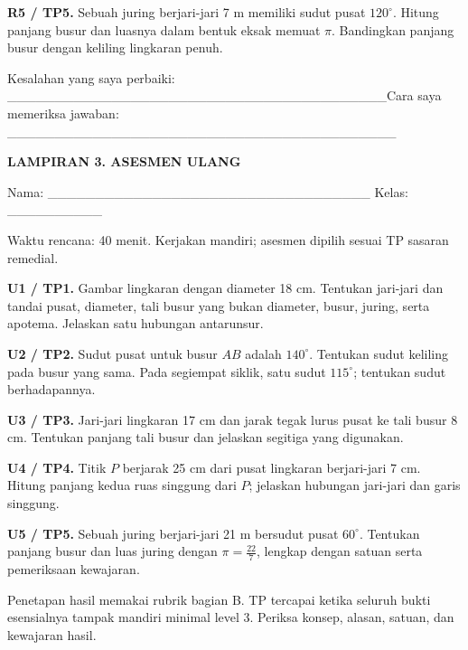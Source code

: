 \documentclass[11pt,a4paper]{article}
\begin{document}
\noindent\textbf{R5 / TP5.} Sebuah juring berjari-jari 7 m memiliki sudut pusat \(120^\circ\). Hitung panjang busur dan luasnya dalam bentuk eksak memuat \(\pi\). Bandingkan panjang busur dengan keliling lingkaran penuh.\par\vspace{10mm}
{\small Kesalahan yang saya perbaiki: \_\_\_\_\_\_\_\_\_\_\_\_\_\_\_\_\_\_\_\_\_\_\_\_\_\_\_\_\_\_\_\_\_\_\_\_\_\_\_\_\newline Cara saya memeriksa jawaban: \_\_\_\_\_\_\_\_\_\_\_\_\_\_\_\_\_\_\_\_\_\_\_\_\_\_\_\_\_\_\_\_\_\_\_\_\_\_\_\_\_\par}\medskip
\clearpage
\begin{center}\bfseries\large LAMPIRAN 3. ASESMEN ULANG\end{center}\medskip
{\small Nama: \_\_\_\_\_\_\_\_\_\_\_\_\_\_\_\_\_\_\_\_\_\_\_\_\_\_\_\_\_\_\_\_\_\_  Kelas: \_\_\_\_\_\_\_\_\_\_\par}\medskip
{\small Waktu rencana: 40 menit. Kerjakan mandiri; asesmen dipilih sesuai TP sasaran remedial.\par}\medskip
\noindent\textbf{U1 / TP1.} Gambar lingkaran dengan diameter 18 cm. Tentukan jari-jari dan tandai pusat, diameter, tali busur yang bukan diameter, busur, juring, serta apotema. Jelaskan satu hubungan antarunsur.\par\vspace{10mm}
\noindent\textbf{U2 / TP2.} Sudut pusat untuk busur \(AB\) adalah \(140^\circ\). Tentukan sudut keliling pada busur yang sama. Pada segiempat siklik, satu sudut \(115^\circ\); tentukan sudut berhadapannya.\par\vspace{10mm}
\noindent\textbf{U3 / TP3.} Jari-jari lingkaran 17 cm dan jarak tegak lurus pusat ke tali busur 8 cm. Tentukan panjang tali busur dan jelaskan segitiga yang digunakan.\par\vspace{10mm}
\noindent\textbf{U4 / TP4.} Titik \(P\) berjarak 25 cm dari pusat lingkaran berjari-jari 7 cm. Hitung panjang kedua ruas singgung dari \(P\); jelaskan hubungan jari-jari dan garis singgung.\par\vspace{10mm}
\noindent\textbf{U5 / TP5.} Sebuah juring berjari-jari 21 m bersudut pusat \(60^\circ\). Tentukan panjang busur dan luas juring dengan \(\pi=\frac{22}{7}\), lengkap dengan satuan serta pemeriksaan kewajaran.\par\vspace{10mm}
{\small Penetapan hasil memakai rubrik bagian B. TP tercapai ketika seluruh bukti esensialnya tampak mandiri minimal level 3. Periksa konsep, alasan, satuan, dan kewajaran hasil.\par}\medskip
\end{document}
